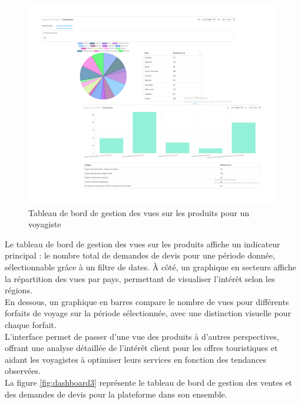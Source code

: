 \documentclass[12pt]{report}
\begin{document}
			\begin{figure}[h]
				\centering
				\includegraphics[width=\textwidth]{dashboard2.png}
				\caption{Tableau de bord de gestion des vues sur les produits pour un voyagiste}
				\label{fig:dashboard2}
			\end{figure}
			\FloatBarrier

			Le tableau de bord de gestion des vues sur les produits affiche un indicateur principal : le nombre total de demandes de devis pour une période donnée, sélectionnable grâce à un filtre de dates. À côté, un graphique en secteurs affiche la répartition des vues par pays, permettant de visualiser l'intérêt selon les régions.\\

			En dessous, un graphique en barres compare le nombre de vues pour différents forfaits de voyage sur la période sélectionnée, avec une distinction visuelle pour chaque forfait.\\

			L'interface permet de passer d'une vue des produits à d'autres perspectives, offrant une analyse détaillée de l'intérêt client pour les offres touristiques et aidant les voyagistes à optimiser leurs services en fonction des tendances observées.
\\

			La figure \ref{fig:dashboard3} représente le tableau de bord de gestion des ventes et des demandes de devis pour la plateforme dans son ensemble.
\end{document}
